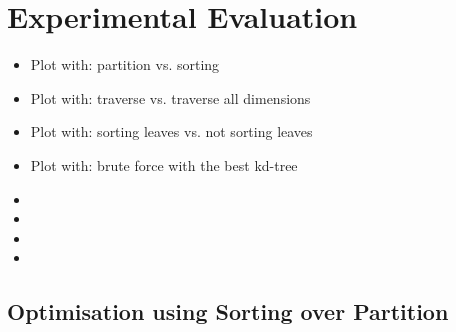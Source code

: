 \section{Experimental Evaluation}
\label{sec:eval}







\begin{itemize}
	\item Plot with: partition vs. sorting
	\item Plot with: traverse vs. traverse all dimensions
	\item Plot with: sorting leaves vs. not sorting leaves
	\item Plot with: brute force with the best kd-tree
	\item 
	\item 
	\item 
	\item 
\end{itemize}	



\subsection{Optimisation using Sorting over Partition}

